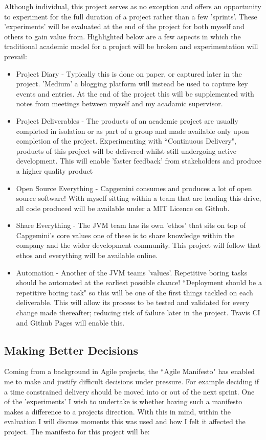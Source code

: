 Although individual, this project serves as no exception and offers an
opportunity to experiment for the full duration of a project rather than a
few 'sprints'. These 'experiments' will be evaluated at the end of
the project for both myself and others to gain value from. Highlighted below
are a few aspects in which the traditional academic model for a project will
be broken and experimentation will prevail:
 \begin{itemize}
  \item Project Diary - Typically this is done on paper, or captured later in
   the project. 'Medium' a blogging platform will instead be used to
   capture key events and entries. At the end of the project this will be
   supplemented with notes from meetings between myself and my acadamic
   supervisor.
  \item Project Deliverables - The products of an academic project are usually
  completed in isolation or as part of a group and made available only upon
  completion of the project. Experimenting with ``Continuous Delivery",
  products of this project will be delivered whilst still undergoing active
  development. This will enable 'faster feedback' from stakeholders and
  produce a higher quality product
  \item Open Source Everything - Capgemini consumes and
  produces a lot of open source software! With myself sitting within a team
  that are leading this drive, all code produced will be available under a MIT
  Licence on Github.
  \item Share Everything - The JVM team has its own 'ethos' that sits on top
  of Capgemini's core values one of these is to share knowledge within the
  company and the wider development community. This project will follow that
  ethos and everything will be available online.
  \item Automation - Another of the JVM teams 'values'. Repetitive boring tasks
  should be automated at the earliest possible chance! ``Deployment should be a
   repetitive boring task" so this will be one of the first things tackled on
   each deliverable. This will allow its process to be tested and validated
   for every change made thereafter; reducing risk of failure later in the
   project. Travis CI and Github Pages will enable this.
 \end{itemize}

\subsection{Making Better Decisions}
Coming from a background in Agile projects, the ``Agile Manifesto" has enabled
me to make and justify difficult decisions under pressure. For example deciding
 if a time constrained delivery should be moved into or out of the next
 sprint. One of the 'experiments' I wish to undertake is whether having such a
 manifesto makes a difference to a projects direction. With this in mind,
 within the evaluation I will discuss moments this was used and how I felt
 it affected the project. The manifesto for this project will be:

